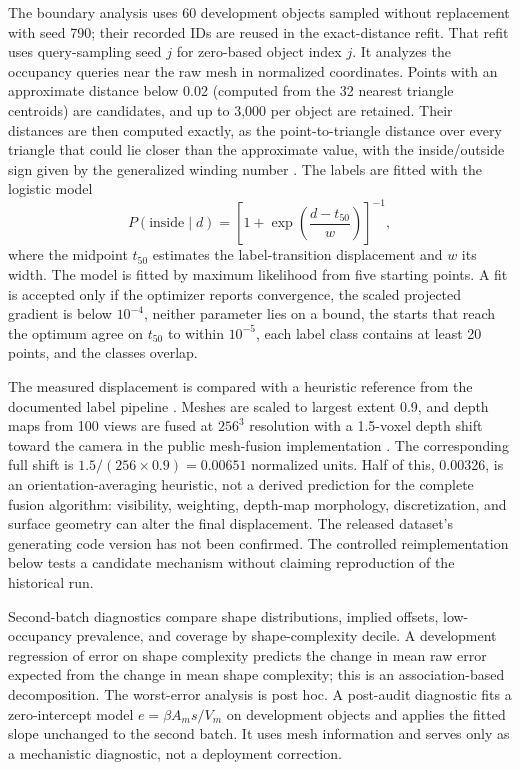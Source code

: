 \documentclass[journal]{IEEEtran}
\begin{document}
The boundary analysis uses 60 development objects sampled without replacement with seed 790; their recorded IDs are reused in the exact-distance refit. That refit uses query-sampling seed $j$ for zero-based object index $j$. It analyzes the occupancy queries near the raw mesh in normalized coordinates. Points with an approximate distance below 0.02 (computed from the 32 nearest triangle centroids) are candidates, and up to 3,000 per object are retained. Their distances are then computed exactly, as the point-to-triangle distance over every triangle that could lie closer than the approximate value, with the inside/outside sign given by the generalized winding number \cite{ref24}. The labels are fitted with the logistic model
\begin{equation}
P(\mathrm{inside}\mid d)=\left[1+\exp\!\left(\frac{d-t_{50}}{w}\right)\right]^{-1},
\end{equation}
where the midpoint $t_{50}$ estimates the label-transition displacement and $w$ its width. The model is fitted by maximum likelihood from five starting points. A fit is accepted only if the optimizer reports convergence, the scaled projected gradient is below $10^{-4}$, neither parameter lies on a bound, the starts that reach the optimum agree on $t_{50}$ to within $10^{-5}$, each label class contains at least 20 points, and the classes overlap.

The measured displacement is compared with a heuristic reference from the documented label pipeline \cite{ref20}. Meshes are scaled to largest extent 0.9, and depth maps from 100 views are fused at $256^3$ resolution with a 1.5-voxel depth shift toward the camera in the public mesh-fusion implementation \cite{ref34}. The corresponding full shift is $1.5/(256\times0.9)=0.00651$ normalized units. Half of this, 0.00326, is an orientation-averaging heuristic, not a derived prediction for the complete fusion algorithm: visibility, weighting, depth-map morphology, discretization, and surface geometry can alter the final displacement. The released dataset's generating code version has not been confirmed. The controlled reimplementation below tests a candidate mechanism without claiming reproduction of the historical run.

Second-batch diagnostics compare shape distributions, implied offsets, low-occupancy prevalence, and coverage by shape-complexity decile. A development regression of error on shape complexity predicts the change in mean raw error expected from the change in mean shape complexity; this is an association-based decomposition. The worst-error analysis is post hoc. A post-audit diagnostic fits a zero-intercept model $e=\beta A_ms/V_m$ on development objects and applies the fitted slope unchanged to the second batch. It uses mesh information and serves only as a mechanistic diagnostic, not a deployment correction.
\end{document}
